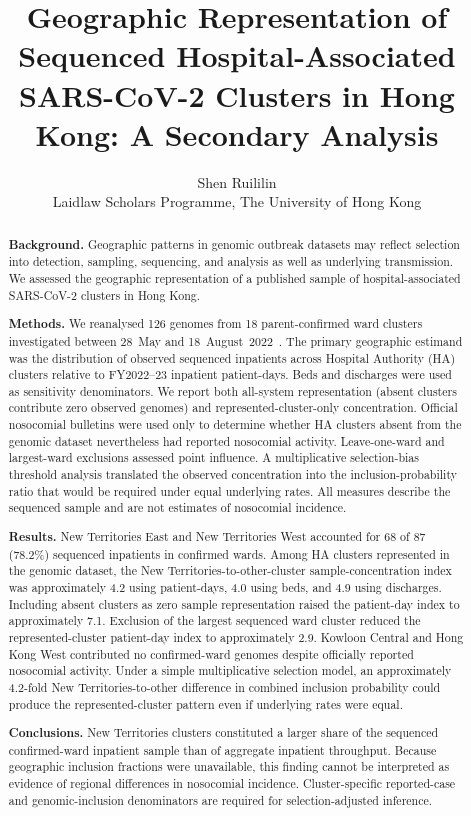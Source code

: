 \documentclass[11pt]{article}
\title{Geographic Representation of Sequenced Hospital-Associated SARS-CoV-2 Clusters in Hong Kong: A Secondary Analysis}
\author{%
Shen Ruililin\\
\small Laidlaw Scholars Programme, The University of Hong Kong
}
\date{}
\begin{document}
\maketitle

\begin{abstract}
\noindent
\textbf{Background.}
Geographic patterns in genomic outbreak datasets may reflect selection into detection, sampling, sequencing, and analysis as well as underlying transmission.
We assessed the geographic representation of a published sample of hospital-associated SARS-CoV-2 clusters in Hong Kong.

\textbf{Methods.}
We reanalysed 126 genomes from 18 parent-confirmed ward clusters investigated between 28~May and 18~August~2022~\cite{gu2026hai}.
The primary geographic estimand was the distribution of observed sequenced inpatients across Hospital Authority (HA) clusters relative to FY2022--23 inpatient patient-days.
Beds and discharges were used as sensitivity denominators.
We report both all-system representation (absent clusters contribute zero observed genomes) and represented-cluster-only concentration.
Official nosocomial bulletins were used only to determine whether HA clusters absent from the genomic dataset nevertheless had reported nosocomial activity.
Leave-one-ward and largest-ward exclusions assessed point influence.
A multiplicative selection-bias threshold analysis translated the observed concentration into the inclusion-probability ratio that would be required under equal underlying rates.
All measures describe the sequenced sample and are not estimates of nosocomial incidence.

\textbf{Results.}
New Territories East and New Territories West accounted for 68 of 87 (78.2\%) sequenced inpatients in confirmed wards.
Among HA clusters represented in the genomic dataset, the New Territories-to-other-cluster sample-concentration index was approximately 4.2 using patient-days, 4.0 using beds, and 4.9 using discharges.
Including absent clusters as zero sample representation raised the patient-day index to approximately 7.1.
Exclusion of the largest sequenced ward cluster reduced the represented-cluster patient-day index to approximately 2.9.
Kowloon Central and Hong Kong West contributed no confirmed-ward genomes despite officially reported nosocomial activity.
Under a simple multiplicative selection model, an approximately 4.2-fold New Territories-to-other difference in combined inclusion probability could produce the represented-cluster pattern even if underlying rates were equal.

\textbf{Conclusions.}
New Territories clusters constituted a larger share of the sequenced confirmed-ward inpatient sample than of aggregate inpatient throughput.
Because geographic inclusion fractions were unavailable, this finding cannot be interpreted as evidence of regional differences in nosocomial incidence.
Cluster-specific reported-case and genomic-inclusion denominators are required for selection-adjusted inference.
\end{abstract}
\end{document}
